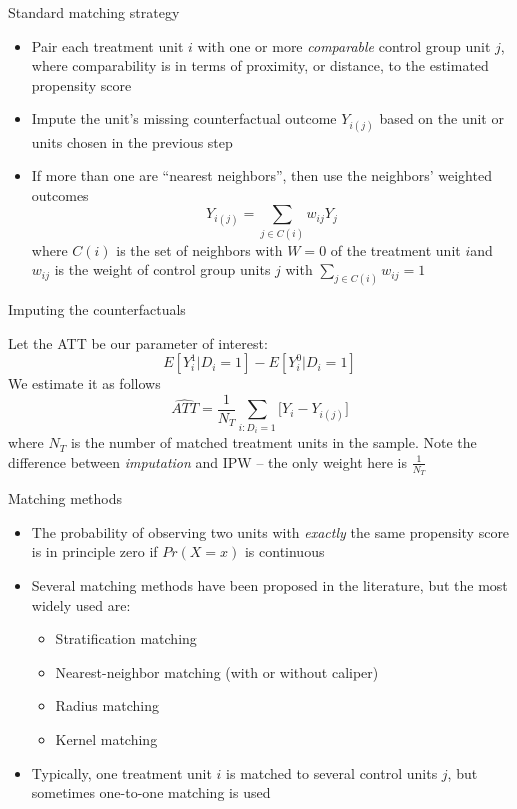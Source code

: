 \documentclass{beamer}
\begin{document}
\begin{frame}{Standard matching strategy}
	
	\begin{itemize}
	\item Pair each treatment unit $i$ with one or more \emph{comparable} control group unit $j$, where comparability is in terms of proximity, or distance, to the estimated propensity score
	\item Impute the unit's missing counterfactual outcome $Y_{i(j)}$ based on the unit or units chosen in the previous step
	\item If more than one are ``nearest neighbors'', then use the neighbors' weighted outcomes  $$Y_{i(j)} = \sum_{j \in C(i)} w_{ij}Y_j$$ where $C(i)$ is the set of neighbors with $W=0$ of the treatment unit $i$and $w_{ij}$ is the weight of control group units $j$ with $\sum_{j \in C(i)} w_{ij} = 1$
	\end{itemize}
\end{frame}


\begin{frame}{Imputing the counterfactuals}
	
	Let the ATT be our parameter of interest: $$E[Y^1_i | D_i=1] - E[Y^0_i | D_i=1]$$We estimate it as follows  $$\widehat{ATT} = \frac{1}{N_T}  \sum_{i:D_i=1} \bigg [Y_i - Y_{i(j)} \bigg ]$$where $N_T$ is the number of matched treatment units in the sample. Note the difference between \emph{imputation} and IPW -- the only weight here is $\frac{1}{N_T}$

\end{frame}

\begin{frame}{Matching methods}
	
	\begin{itemize}
	\item The probability of observing two units with \emph{exactly} the same propensity score is in principle zero if $Pr(X=x)$ is continuous
	\item Several matching methods have been proposed in the literature, but the most widely used are:
		\begin{itemize}
		\item Stratification matching
		\item Nearest-neighbor matching (with or without caliper)
		\item Radius matching
		\item Kernel matching
		\end{itemize}
	\item Typically, one treatment unit $i$ is matched to several control units $j$, but sometimes one-to-one matching is used
	\end{itemize}
	
\end{frame}
\end{document}
